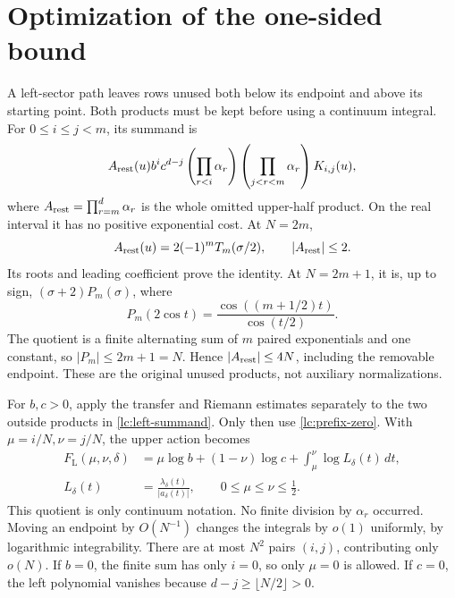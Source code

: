 \section{Optimization of the one-sided bound}\label{lc:left}
A left-sector path leaves rows unused both below its endpoint and
above its starting point. Both products must be kept before using a
continuum integral. For $0\le i\le j<m$, its summand is
\begin{equation}\label{lc:left-summand}
 A_{\rm rest}(u)b^ic^{d-j}
       \left(\prod_{r<i}\alpha_r\right)
       \left(\prod_{j<r<m}\alpha_r\right)K_{i,j}(u),
\end{equation}
where \(A_{\rm rest}=\prod_{r=m}^d\alpha_r\) is the whole omitted
upper-half product. On the real interval it has no positive
exponential cost. At \(N=2m\),
\[
 A_{\rm rest}(u)=2(-1)^mT_m(\sigma/2),\qquad |A_{\rm rest}|\le2.
\]
Its roots and leading coefficient prove the identity.
At \(N=2m+1\), it is, up to sign, \((\sigma+2)P_m(\sigma)\), where
\[
 P_m(2\cos t)=\frac{\cos((m+1/2)t)}{\cos(t/2)}.
\]
The quotient is a finite alternating sum of \(m\) paired exponentials
and one constant, so \(|P_m|\le2m+1=N\).
Hence \(|A_{\rm rest}|\le4N\), including the removable endpoint.
These are the original unused products, not auxiliary normalizations.

For \(b,c>0\), apply the transfer and Riemann estimates separately
to the two outside products in \eqref{lc:left-summand}. Only then
use \eqref{lc:prefix-zero}. With \(\mu=i/N,\nu=j/N\), the upper
action becomes
\begin{equation}\label{lc:left-action}
\begin{split}
 F_{\mathrm L}(\mu,\nu,\delta)
 &=\mu\log b+(1-\nu)\log c+
                   \int_\mu^\nu\log L_\delta(t)\,dt,\\
 L_\delta(t)&=\frac{\lambda_\delta(t)}{|a_\delta(t)|},
                      \qquad0\le\mu\le\nu\le\tfrac12.
\end{split}
\end{equation}
This quotient is only continuum notation. No finite division by
\(\alpha_r\) occurred. Moving an endpoint by \(O(N^{-1})\) changes
the integrals by \(o(1)\) uniformly, by logarithmic integrability.
There are at most \(N^2\) pairs \((i,j)\), contributing only \(o(N)\).
If \(b=0\), the finite sum has only \(i=0\), so only \(\mu=0\)
is allowed. If \(c=0\), the left polynomial vanishes because
\(d-j\ge\lfloor N/2\rfloor>0\).

